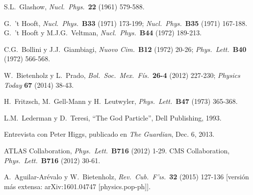 \begin{thebibliography}{10}
 S.L.\ Glashow,
{\it Nucl.\ Phys.}\ {\bf 22} (1961) 579-588.

 G.\ 't Hooft,
{\em Nucl.\ Phys.}\ {\bf B33} (1971) 173-199;
{\em Nucl.\ Phys.}\ {\bf B35} (1971) 167-188.
G.\ 't Hooft y M.J.G.\ Veltman,
{\em Nucl.\ Phys.}\ {\bf B44} (1972) 189-213.

 C.G.\ Bollini y J.J.\ Giambiagi,
{\em Nuovo Cim.}\ {\bf B12} (1972) 20-26;
{\em Phys.\ Lett.}\ {\bf B40} (1972) 566-568.

 W.\ Bietenholz y L.\ Prado, 
{\em Bol.\ Soc.\ Mex.\ F\'is.}\ {\bf 26-4} (2012) 227-230;
{\em Physics Today} {\bf 67} (2014) 38-43.

 H.\ Fritzsch, M.\ Gell-Mann y H.\ Leutwyler,
{\em Phys.\ Lett.}\ {\bf B47} (1973) 365-368.

 L.M.\ Lederman y D.\ Teresi,
``The God Particle'', Dell Publishing, 1993.

 Entrevista con Peter Higgs, publicado en
  {\em The Guardian}, Dec. 6, 2013.
  
 ATLAS Collaboration,
{\em Phys.\ Lett.}\ {\bf B716} (2012) 1-29.
CMS Collaboration,
{\em Phys.\ Lett.}\ {\bf B716} (2012) 30-61.

 A.\ Aguilar-Ar\'{e}valo y W.\ Bietenholz,
{\em Rev.\ Cub.\ F\a'{\i}s.}\ {\bf 32} (2015) 127-136
[versi\'on m\'as extensa: arXiv:1601.04747 [physics.pop-ph]].


\end{thebibliography}
